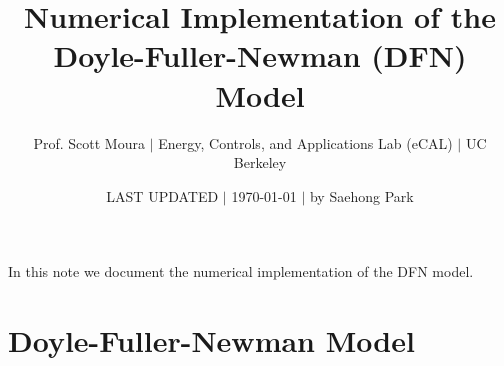 \documentclass[12pt]{article}
\title{Numerical Implementation of the Doyle-Fuller-Newman (DFN) Model}
\author{{\normalsize Prof. Scott Moura} $\mid$ {\normalsize Energy, Controls, and Applications Lab (eCAL) $\mid$ UC Berkeley}}
\date{{\normalsize LAST UPDATED $\mid$ \today} $\mid$ by Saehong Park}                                           %
\begin{document}
\maketitle


In this note we document the numerical implementation of the DFN model.

\section{Doyle-Fuller-Newman Model}\label{sec:dfn}
\end{document}
